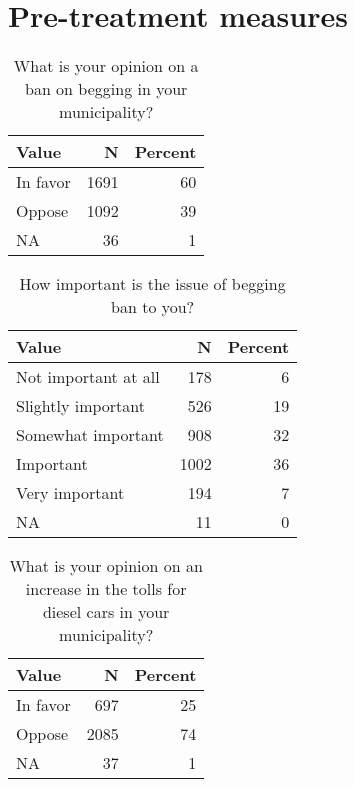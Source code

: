 \documentclass[
]{book}
\begin{document}
\hypertarget{pre-treatment-measures-2}{%
\section{Pre-treatment measures}\label{pre-treatment-measures-2}}

\begin{table}[H]

\caption{\label{tab:unnamed-chunk-2}What is your opinion on a ban on begging in your municipality?}
\centering
\begin{tabular}[t]{lrr}
\toprule
Value & N & Percent\\
\midrule
In favor & 1691 & 60\\
Oppose & 1092 & 39\\
NA & 36 & 1\\
\bottomrule
\end{tabular}
\end{table}

\begin{table}[H]

\caption{\label{tab:unnamed-chunk-2}How important is the issue of begging ban to you?}
\centering
\begin{tabular}[t]{lrr}
\toprule
Value & N & Percent\\
\midrule
Not important at all & 178 & 6\\
Slightly important & 526 & 19\\
Somewhat important & 908 & 32\\
Important & 1002 & 36\\
Very important & 194 & 7\\
NA & 11 & 0\\
\bottomrule
\end{tabular}
\end{table}

\begin{table}[H]

\caption{\label{tab:unnamed-chunk-2}What is your opinion on an increase in the tolls for diesel cars in your municipality?}
\centering
\begin{tabular}[t]{lrr}
\toprule
Value & N & Percent\\
\midrule
In favor & 697 & 25\\
Oppose & 2085 & 74\\
NA & 37 & 1\\
\bottomrule
\end{tabular}
\end{table}
\end{document}
